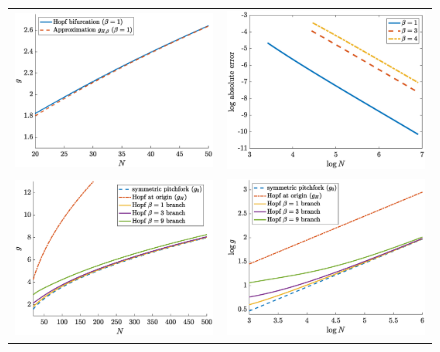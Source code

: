 \documentclass[reqno]{siamonline190516}
\begin{document}
\begin{figure}
    \centering
    \begin{tabular}{cc}
    \includegraphics[width=7.8cm]{images/Hopfapproxbeta1.eps} &
    \includegraphics[width=7.8cm]{images/Hopfapproxerror.eps} \\
    \includegraphics[width=7.8cm]{images/HopfNvsg.eps} &
    \includegraphics[width=7.8cm]{images/HopflogNvslogg.eps}

\end{tabular}
\end{figure}
\end{document}
